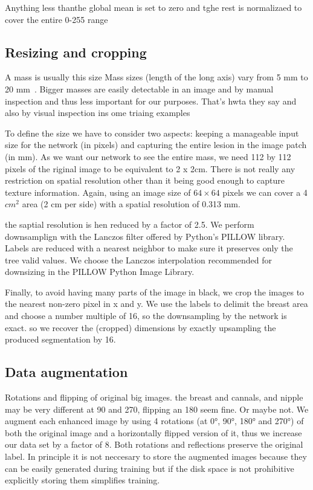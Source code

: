 Anything less thanthe global mean is set to zero and tghe rest is normalizaed to cover the entire 0-255 range

\subsection{Resizing and cropping}
A mass is usually this size
Mass sizes (length of the long axis) vary from 5 mm to 20 mm~\cite{Sahiner1996}. Bigger masses are easily detectable in an image and by manual inspection and thus less important for our purposes. 
That's hwta they say and also by visual inspection ins ome triaing examples

To define the size we have to consider two aspects: keeping a manageable input size for the network (in pixels) and capturing the entire lesion in the image patch (in mm).
As we want our network to see the entire mass, we need 112 by 112 pixels of the riginal image to be equivalent to 2 x 2cm. 
There is not really any restriction on spatial resolution other than it being good enough to capture texture information. Again, using an image size of $64 \times 64$ pixels we can cover a 4 $cm^2$ area (2 cm per side) with a spatial resolution of 0.313 mm.

the saptial resolution is hen reduced by a factor of 2.5. We perform downsamplign with the Lanczos filter offered by Python's PILLOW library. Labels are reduced with a nearest neighbor to make sure it preserves only the tree valid values.
We choose the Lanczos interpolation recommended for downsizing in the PILLOW Python Image Library.



Finally, to avoid having many parts of the image in black, we crop the images to the nearest non-zero pixel in x and y. We use the labels to delimit the breast area and choose a number multiple of 16, so the downsampling by the network is exact. so we recover the (cropped) dimensions by exactly upsampling the produced segmentation by 16.
	
\subsection{Data augmentation}
Rotations and flipping of original big images. the breast and cannals, and nipple may be very different at 90 and 270, flipping an 180 seem fine. Or maybe not.
We augment each enhanced image by using 4 rotations (at 0°, 90°, 180° and 270°) of both the original image and a horizontally flipped version of it, thus we increase our data set by a factor of 8. Both rotations and reflections preserve the original label. In principle it is not neccesary to store the augmented images because they can be easily generated during training but if the disk space is not prohibitive explicitly storing them simplifies training.

